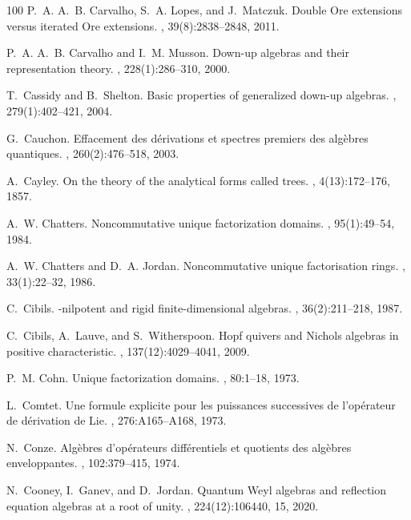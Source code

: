 \documentclass{commat}
\begin{document}
\begin{thebibliography}{100}
P.~A. A.~B. Carvalho, S.~A. Lopes, and J.~Matczuk.
\newblock Double {O}re extensions versus iterated {O}re extensions.
, 39(8):2838--2848, 2011.

P.~A. A.~B. Carvalho and I.~M. Musson.
\newblock Down-up algebras and their representation theory.
, 228(1):286--310, 2000.

T.~Cassidy and B.~Shelton.
\newblock Basic properties of generalized down-up algebras.
, 279(1):402--421, 2004.

G.~Cauchon.
\newblock Effacement des d\'{e}rivations et spectres premiers des alg\`ebres
  quantiques.
, 260(2):476--518, 2003.

A.~Cayley.
\newblock On the theory of the analytical forms called trees.
, 4(13):172--176, 1857.

A.~W. Chatters.
\newblock Noncommutative unique factorization domains.
, 95(1):49--54, 1984.

A.~W. Chatters and D.~A. Jordan.
\newblock Noncommutative unique factorisation rings.
, 33(1):22--32, 1986.

C.~Cibils.
-nilpotent and rigid finite-dimensional algebras.
, 36(2):211--218, 1987.

C.~Cibils, A.~Lauve, and S.~Witherspoon.
\newblock Hopf quivers and {N}ichols algebras in positive characteristic.
, 137(12):4029--4041, 2009.

P.~M. Cohn.
\newblock Unique factorization domains.
, 80:1--18, 1973.

L.~Comtet.
\newblock Une formule explicite pour les puissances successives de
  l'op\'erateur de d\'erivation de {L}ie.
, 276:A165--A168, 1973.

N.~Conze.
\newblock Alg\`ebres d'op\'{e}rateurs diff\'{e}rentiels et quotients des
  alg\`ebres enveloppantes.
, 102:379--415, 1974.

N.~Cooney, I.~Ganev, and D.~Jordan.
\newblock Quantum {W}eyl algebras and reflection equation algebras at a root of
  unity.
, 224(12):106440, 15, 2020.


\end{thebibliography}
\end{document}
